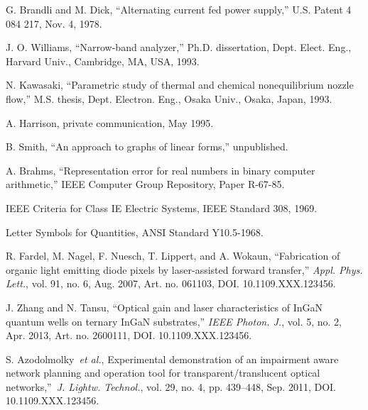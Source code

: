 \documentclass{ieeeaccess}
\begin{document}
\begin{thebibliography}{00}
     G. Brandli and M. Dick, ``Alternating current fed power supply,'' U.S. Patent 4 084 217, Nov. 4, 1978.

     J. O. Williams, ``Narrow-band analyzer,'' Ph.D. dissertation, Dept. Elect. Eng., Harvard Univ., Cambridge, MA, USA, 1993.

     N. Kawasaki, ``Parametric study of thermal and chemical nonequilibrium nozzle flow,'' M.S. thesis, Dept. Electron. Eng., Osaka Univ., Osaka, Japan, 1993.

     A. Harrison, private communication, May 1995.

     B. Smith, ``An approach to graphs of linear forms,'' unpublished.

     A. Brahms, ``Representation error for real numbers in binary computer arithmetic,'' IEEE Computer Group Repository, Paper R-67-85.

     IEEE Criteria for Class IE Electric Systems, IEEE Standard 308, 1969.

     Letter Symbols for Quantities, ANSI Standard Y10.5-1968.

     R. Fardel, M. Nagel, F. Nuesch, T. Lippert, and A. Wokaun, ``Fabrication of organic light emitting diode pixels by laser-assisted forward transfer,'' \emph{Appl. Phys. Lett.}, vol. 91, no. 6, Aug. 2007, Art. no. 061103, DOI. 10.1109.XXX.123456.

     J. Zhang and N. Tansu, ``Optical gain and laser characteristics of InGaN quantum wells on ternary InGaN substrates,'' \emph{IEEE Photon. J.}, vol. 5, no. 2, Apr. 2013, Art. no. 2600111, DOI. 10.1109.XXX.123456.

     S. Azodolmolky~\emph{et al.}, Experimental demonstration of an impairment aware network planning and operation tool for transparent/translucent optical networks,''~\emph{J. Lightw. Technol.}, vol. 29, no. 4, pp. 439--448, Sep. 2011, DOI. 10.1109.XXX.123456.

\end{thebibliography}
\end{document}
